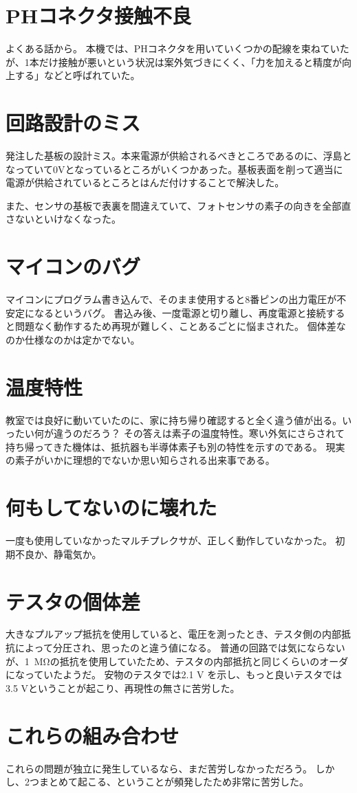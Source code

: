 \documentclass{ltjsreport}
\begin{document}
\section{PHコネクタ接触不良}
よくある話から。
本機では、PHコネクタを用いていくつかの配線を束ねていたが、1本だけ接触が悪いという状況は案外気づきにくく、「力を加えると精度が向上する」などと呼ばれていた。

\section{回路設計のミス}
発注した基板の設計ミス。本来電源が供給されるべきところであるのに、浮島となっていて0Vとなっているところがいくつかあった。基板表面を削って適当に電源が供給されているところとはんだ付けすることで解決した。

また、センサの基板で表裏を間違えていて、フォトセンサの素子の向きを全部直さないといけなくなった。

\section{マイコンのバグ}
マイコンにプログラム書き込んで、そのまま使用すると8番ピンの出力電圧が不安定になるというバグ。
書込み後、一度電源と切り離し、再度電源と接続すると問題なく動作するため再現が難しく、ことあるごとに悩まされた。
個体差なのか仕様なのかは定かでない。

\section{温度特性}
教室では良好に動いていたのに、家に持ち帰り確認すると全く違う値が出る。いったい何が違うのだろう？
その答えは素子の温度特性。寒い外気にさらされて持ち帰ってきた機体は、抵抗器も半導体素子も別の特性を示すのである。
現実の素子がいかに理想的でないか思い知らされる出来事である。

\section{何もしてないのに壊れた}
一度も使用していなかったマルチプレクサが、正しく動作していなかった。
初期不良か、静電気か。

\section{テスタの個体差}
大きなプルアップ抵抗を使用していると、電圧を測ったとき、テスタ側の内部抵抗によって分圧され、思ったのと違う値になる。
普通の回路では気にならないが、\SI{1}{\Mohm}の抵抗を使用していたため、テスタの内部抵抗と同じくらいのオーダになっていたようだ。
安物のテスタでは2.1 V を示し、もっと良いテスタでは3.5 Vということが起こり、再現性の無さに苦労した。

\section{これらの組み合わせ}
これらの問題が独立に発生しているなら、まだ苦労しなかっただろう。
しかし、2つまとめて起こる、ということが頻発したため非常に苦労した。
\end{document}
